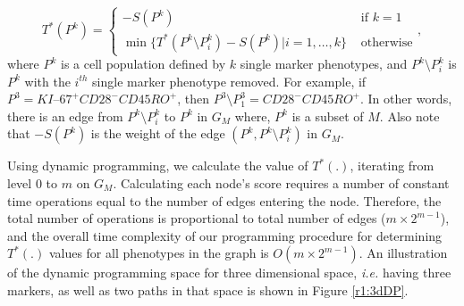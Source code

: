 \begin{equation}
  T^*(P^k) = \left\{ \begin{array}{cl}
      -S(P^k) &\mbox{ if $k = 1$} \\
      \min\{T^*(P^k \setminus P^{k}_{i}) - S(P^k)|i=1,\dots,k\} &\mbox{ otherwise}
    \end{array} \right.,
  \label{totalscore}
\end{equation} 
where $P^k$ is a cell population defined by  $k$  single marker phenotypes, and $P^k \setminus P^k_{i}$ is $P^k$
with the $i^{th}$ single marker phenotype removed.  For example, if $P^3=KI\mbox{--}67^+CD28^-CD45RO^+$, then
$P^3\setminus P^3_1=CD28^-CD45RO^+$.  In other words, there is an edge from $P^k \setminus P^k_{i}$ to $P^k$ in $G_M$
where, $P^k$ is a subset of $M$. Also note that $-S(P^k)$ is the weight of the edge $(P^k, P^k \setminus P^k_{i})$ in
$G_M$.


Using dynamic programming, we calculate the value of $T^*(.)$, iterating from level $0$ to $m$ on $G_M$.
Calculating each node's score requires a number of constant time operations equal to the number of edges entering the
node.  Therefore, the total number of operations is proportional to total number of edges ($m \times 2^{m-1}$), and the
overall time complexity of our programming procedure for determining $T^*(.)$ values for all phenotypes in the graph is
$O(m \times 2^{m-1})$.
An illustration of the dynamic programming space for three dimensional space, \emph{i.e.} having three markers, as well as 
two paths in that space is shown in Figure \ref{r1:3dDP}.


